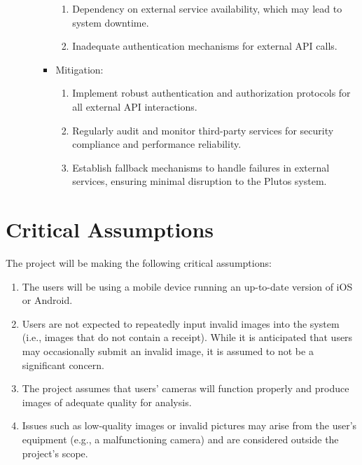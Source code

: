 \documentclass{article}
\begin{document}
\begin{enumerate}
\begin{enumerate}
\begin{itemize}
\begin{enumerate}
                    \item Dependency on external service availability, which may lead to system downtime.
                    \item Inadequate authentication mechanisms for external API calls.
				\end{enumerate}
			\item Mitigation:
				\begin{enumerate}
					\item Implement robust authentication and authorization protocols for all external API interactions.
                    \item Regularly audit and monitor third-party services for security compliance and performance reliability.
                    \item Establish fallback mechanisms to handle failures in external services, ensuring minimal disruption 
                    to the Plutos system.
                \end{enumerate}
        \end{itemize}
    \end{enumerate}
\end{enumerate}


\section{Critical Assumptions}

The project will be making the following critical assumptions: 
\begin{enumerate}
    \item The users will be
    using a mobile device running an up-to-date version of iOS or Android.
    \item Users are
    not expected to repeatedly input invalid images into the system (i.e., images
    that do not contain a receipt). While it is anticipated that users may
    occasionally submit an invalid image, it is assumed to not be a significant
    concern.
    \item The project assumes that users' cameras will function properly and produce 
    images of adequate quality for analysis.
    \item Issues such as low-quality images or invalid pictures may arise from the 
    user's equipment (e.g., a malfunctioning camera) and are considered outside the 
    project's scope.
\end{enumerate}  
\end{document}
